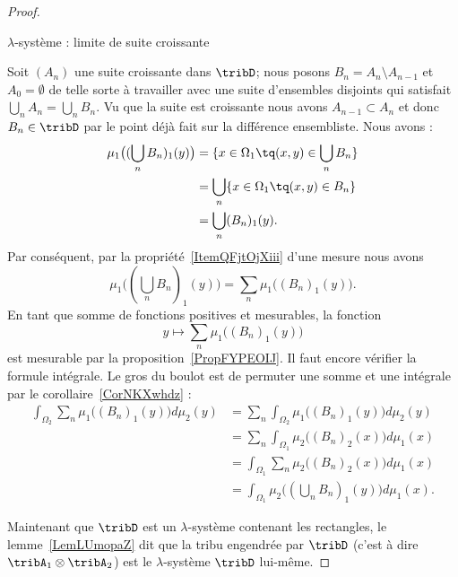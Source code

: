 \begin{proof}
\begin{subproof}
        \item[\( \lambda\)-système : limite de suite croissante]

            Soit \( (A_n)\) une suite croissante dans \( \tribD\); nous posons \( B_n=A_n\setminus A_{n-1}\) et \( A_0=\emptyset\) de telle sorte à travailler avec une suite d'ensembles disjoints qui satisfait \( \bigcup_nA_n=\bigcup_nB_n\). Vu que la suite est croissante nous avons \( A_{n-1}\subset A_n\) et donc \( B_n\in\tribD\) par le point déjà fait sur la différence ensembliste. Nous avons :
            \begin{subequations}
                \begin{align}
                    \mu_1\big( (\bigcup_nB_n)_1(y) \big)&=\{ x\in \Omega_1\tq (x,y)\in\bigcup_nB_n \}\\
                    &=\bigcup_n\{ x\in\Omega_1\tq (x,y)\in B_n \}\\
                    &=\bigcup_n (B_n)_1(y).
                \end{align}
            \end{subequations}
            Par conséquent, par la propriété~\ref{ItemQFjtOjXiii} d'une mesure nous avons
            \begin{equation}
                \mu_1\big( (\bigcup_nB_n)_1(y) \big)=\sum_n\mu_1\big( (B_n)_1(y) \big).
            \end{equation}
            En tant que somme de fonctions positives et mesurables, la fonction
            \begin{equation}
                y\mapsto\sum_n\mu_1\big( (B_n)_1(y) \big)
            \end{equation}
            est mesurable par la proposition~\ref{PropFYPEOIJ}. Il faut encore vérifier la formule intégrale. Le gros du boulot est de permuter une somme et une intégrale par le corollaire~\ref{CorNKXwhdz} :
            \begin{subequations}
                \begin{align}
                    \int_{\Omega_2}\sum_n\mu_1\big( (B_n)_1(y) \big)d\mu_2(y)&=\sum_n\int_{\Omega_2}\mu_1\big( (B_n)_1(y) \big)d\mu_2(y)\\
                    &=\sum_n\int_{\Omega_1}\mu_2\big( (B_n)_2(x) \big)d\mu_1(x)\\
                    &=\int_{\Omega_1}\sum_n\mu_2\big( (B_n)_2(x) \big)d\mu_1(x)\\
                    &=\int_{\Omega_1}\mu_2\big( (\bigcup_nB_n)_1(y) \big)d\mu_1(x).
                \end{align}
            \end{subequations}
    \end{subproof}
    Maintenant que \( \tribD\) est un $\lambda$-système contenant les rectangles, le lemme~\ref{LemLUmopaZ} dit que la tribu engendrée par \( \tribD\) (c'est à dire \( \tribA_1\otimes \tribA_2\)) est le $\lambda$-système \( \tribD\) lui-même.


\end{proof}
